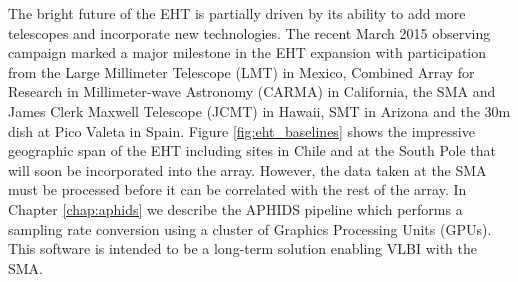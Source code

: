 The bright future of the EHT is partially driven by its ability to add more telescopes and
incorporate new technologies.  The recent March 2015 observing campaign marked a major milestone in
the EHT expansion with participation from the Large Millimeter Telescope (LMT) in Mexico, Combined Array for 
Research in Millimeter-wave Astronomy (CARMA) in California, the SMA and James Clerk Maxwell Telescope (JCMT) in
Hawaii, SMT in Arizona and the 30m dish at Pico Valeta in Spain.  Figure \ref{fig:eht_baselines} shows the
impressive geographic span of the EHT including sites in Chile and at the South Pole that will soon be 
incorporated into the array.  However, the data taken at the SMA must be 
processed before it
can be correlated with the rest of the array.  In Chapter \ref{chap:aphids} we describe the APHIDS pipeline
which performs a sampling rate conversion using a cluster of Graphics Processing Units (GPUs).  This software
is intended to be a long-term solution enabling VLBI with the SMA.
